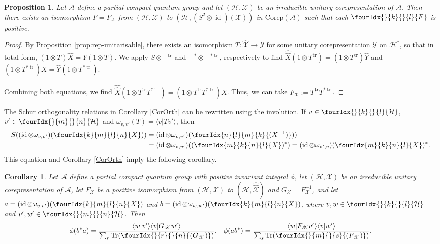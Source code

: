 \documentclass[10pt]{article}
\DeclareMathOperator{\id}{id}
\DeclareMathOperator{\tr}{\mathrm{tr}}
\newcommand{\dual}[1]{#1^{*}}
\newcommand{\dualop}[1]{#1^{\tr}}
\newcommand{\dualco}[1]{\hat{#1}}
\newcommand{\Corep}{\mathrm{Corep}}
\newcommand{\Hsp}{\mathcal{H}}
\newcommand{\Tr}{\mathrm{Tr}}
\newcommand{\Gr}[5]{\fourIdx{#2}{#4}{#3}{#5}{#1}}%
\newcommand{\Gru}[3]{\Gr{#1}{}{}{#2}{#3}}
\newtheorem{Prop}[Theorem]{Proposition}
\newtheorem{Cor}[Theorem]{Corollary}
\theoremstyle{definition}
\numberwithin{equation}{section}
\begin{document}
\begin{Prop} \label{prop:rep-unitary-bidual}
  Let $\mathscr{A}$ define a partial compact quantum group and let
  $(\Hsp,\mathscr{X})$ be an irreducible unitary corepresentation of
  $\mathscr{A}$.  Then there exists an isomorphism $F=F_{\mathscr{X}}$
  from $(\Hsp,\mathscr{X})$ to 
  $(\Hsp,(S^{2} \otimes \id)(\mathscr{X}))$ in $\Corep(\mathscr{A})$ such
  that each $\Gru{F}{k}{l}$ is positive.
\end{Prop}
\begin{proof}
 By Proposition \ref{prop:rep-unitarisable}, there exists an
  isomorphism $T \colon \dualco{\mathscr{X}} \to \mathscr{Y}$ for some
  unitary corepresentation $\mathscr{Y}$ on $\dual{\Hsp}$, so that in total form,
  $(1\otimes T)\dualco{X} = Y(1 \otimes T)$.
We  apply   $S \otimes -^{\tr}$ and $-^{*} \otimes -^{*\tr}$,
respectively to find $ \dualco{\dualco{X}}(1 \otimes \dualop{T}) = (1 \otimes
  \dualop{T})\dualco{Y}$ and $(1 \otimes T^{*\tr})X=\dualco{Y}(1\otimes T^{*\tr}).$

Combining both equations, we
find $\dualco{\dualco{X}}(1 \otimes \dualop{T}T^{*\tr})=(1 \otimes
\dualop{T}T^{*\tr})X$. Thus, we can take
$F_{\mathscr{X}}:=\dualop{T}T^{*\tr}$.
\end{proof}

The Schur orthogonality relations in Corollary \ref{CorOrth} can be
rewritten using the involution. If $v \in \Gru{\Hsp}{k}{l}$, $v' \in \Gru{\Hsp}{m}{n}$
and $\omega_{v,v'}(T) = \langle v|Tv'\rangle$, then 
\begin{align*}
  S((\id \otimes \omega_{v,v'})(\Gr{X}{k}{l}{m}{n})) &=
  (\id \otimes \omega_{v,v'}) (\Gr{(X^{-1})}{n}{m}{l}{k})) \\ & =
  (\id \otimes \omega_{v,v'})( (\Gr{X}{m}{n}{k}{l})^{*}) =
  (\id \otimes \omega_{v',v})(\Gr{X}{m}{n}{k}{l})^{*}.
\end{align*}
This equation and Corollary \ref{CorOrth} imply the following corollary.
\begin{Cor}\label{cor:rep-unitary-schur-orthogonality}
  Let $\mathscr{A}$ define a partial compact quantum group with
  positive invariant integral $\phi$, let $(\Hsp,\mathscr{X})$ be an irreducible
  unitary corepresentation of $\mathscr{A}$, let $F_{\mathscr{X}}$ be a positive
  isomorphism from $(\Hsp,\mathscr{X})$ to
  $(\Hsp,\dualco{\dualco{\mathscr{X}}})$ and
  $G_{\mathscr{X}}=F^{-1}_{{\mathscr{X}}}$, and let $a=(\id \otimes
  \omega_{v,v'})(\Gr{X}{k}{l}{m}{n})$ and $b=(\id \otimes
  \omega_{w,w'})(\Gr{X}{k}{l}{m}{n})$, where $v,w \in
  \Gru{\Hsp}{k}{l}$ and $v',w' \in \Gru{\Hsp}{m}{n}$.  Then
\begin{align*}
  \phi(b^{*}a) &= \frac{\langle w|v'\rangle\langle v|G_{\mathscr{X}}w'\rangle}{\sum_{r}
    \Tr(\Gru{(G_{{\mathscr{X}}})}{r}{n})}, & \phi(ab^{*}) = \frac{\langle
    w|F_{\mathscr{X}}v'\rangle \langle v|w'\rangle}{\sum_{s}
    \Tr(\Gru{(F_{{\mathscr{X}}})}{m}{s})}.
\end{align*}
\end{Cor}
\end{document}

